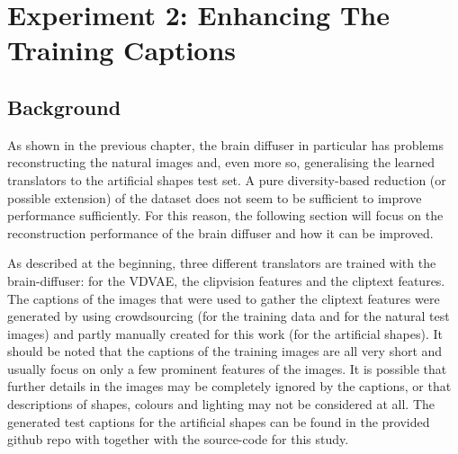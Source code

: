 \section{Experiment 2: Enhancing The Training Captions}

\subsection{Background}

As shown in the previous chapter, the brain diffuser in particular has problems reconstructing the natural images and, even more so, generalising the learned translators to the artificial shapes test set. A pure diversity-based reduction (or possible extension) of the dataset does not seem to be sufficient to improve performance sufficiently. For this reason, the following section will focus on the reconstruction performance of the brain diffuser and how it can be improved. 

As described at the beginning, three different translators are trained with the brain-diffuser: for the VDVAE, the clipvision features and the cliptext features. The captions of the images that were used to gather the cliptext features were generated by using crowdsourcing (for the training data and for the natural test images) and partly manually created for this work (for the artificial shapes). It should be noted that the captions of the training images are all very short and usually focus on only a few prominent features of the images. It is possible that further details in the images may be completely ignored by the captions, or that descriptions of shapes, colours and lighting may not be considered at all. The generated test captions for the artificial shapes can be found in the provided github repo with together with the source-code for this study\cite{mildenbergerKamitaniLabBrain_diffuser}.

